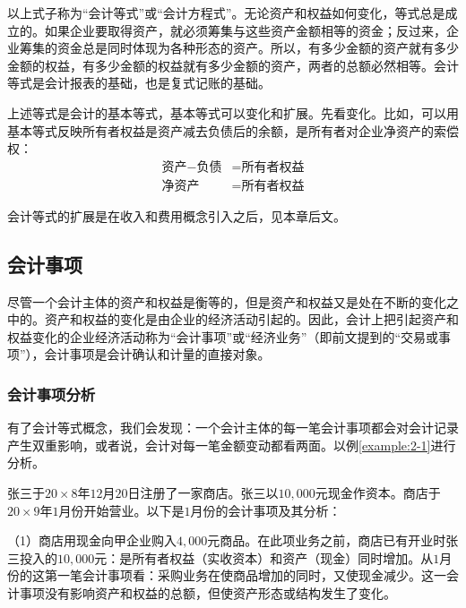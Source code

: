 		以上式子称为“会计等式”或“会计方程式”。无论资产和权益如何变化，等式总是成立的。如果企业要取得资产，就必须筹集与这些资产金额相等的资金；反过来，企业筹集的资金总是同时体现为各种形态的资产。所以，有多少金额的资产就有多少金额的权益，有多少金额的权益就有多少金额的资产，两者的总额必然相等。会计等式是会计报表的基础，也是复式记账的基础。
		
		上述等式是会计的基本等式，基本等式可以变化和扩展。先看变化。比如，可以用基本等式反映所有者权益是资产减去负债后的余额，是所有者对企业净资产的索偿权：
		\begin{align*}
			\text{资产} - \text{负债} &= \text{所有者权益} \\ 
			\text{净资产} &= \text{所有者权益}
		\end{align*}
		
		会计等式的扩展是在收入和费用概念引入之后，见本章后文。

		\subsection{会计事项}

		尽管一个会计主体的资产和权益是衡等的，但是资产和权益又是处在不断的变化之中的。资产和权益的变化是由企业的经济活动引起的。因此，会计上把引起资产和权益变化的企业经济活动称为“会计事项”或“经济业务”（即前文提到的“交易或事项”），会计事项是会计确认和计量的直接对象。
		
		\subsubsection{会计事项分析}
		
		有了会计等式概念，我们会发现：一个会计主体的每一笔会计事项都会对会计记录产生双重影响，或者说，会计对每一笔金额变动都看两面。以例\ref{example:2-1}进行分析。

		\example\label{example:2-1} 张三于$20 \times 8$年$12$月$20$日注册了一家商店。张三以$10,000$元现金作资本。商店于$20 \times 9$年$1$月份开始营业。以下是$1$月份的会计事项及其分析：

		（1）商店用现金向甲企业购入$4,000$元商品。在此项业务之前，商店已有开业时张三投入的$10,000$元：是所有者权益（实收资本）和资产（现金）同时增加。从$1$月份的这第一笔会计事项看：采购业务在使商品增加的同时，又使现金减少。这一会计事项没有影响资产和权益的总额，但使资产形态或结构发生了变化。

